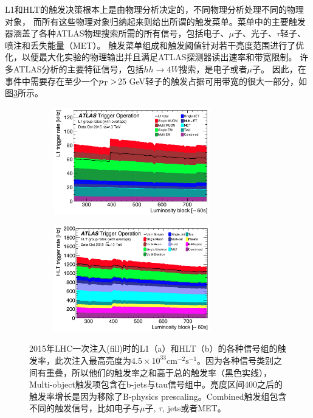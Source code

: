 L1和HLT的触发决策根本上是由物理分析决定的，不同物理分析处理不同的物理对象，
而所有这些物理对象归纳起来则给出所谓的触发菜单。菜单中的主要触发器涵盖了各种ATLAS物理搜索所需的所有信号，包括电子、$\mu$子、光子、$\tau$轻子、喷注和丢失能量（MET）。
触发菜单组成和触发阈值针对若干亮度范围进行了优化，以便最大化实验的物理输出并且满足ATLAS探测器读出速率和带宽限制。
许多ATLAS分析的主要特征信号，包括$hh\rightarrow 4W$搜索，是电子或者$\mu$子。 因此，在事件中需要存在至少一个$p_{\text{T}}>$25 GeV轻子的触发占据可用带宽的很大一部分，如图\ref{fig:Trigger_singlelepton}所示。
\begin{figure}[h]
\begin{center}
\begin{subfigure}[b]{\textwidth}
\centering
   \includegraphics[width=0.75\textwidth]{fig/content_menu_figures_Time_L1GroupRate_Stack.png}
   \caption{}
  \label{fig:L1_menu_rates}
  \end{subfigure}
 \begin{subfigure}[b]{\textwidth}
 \centering
  \includegraphics[width=0.75\textwidth]{fig/content_menu_figures_Time_HLTGroupRate_Stack.png}
   \caption{}
   \label{fig:HLT_menu_rates}
  \end{subfigure}
\caption{2015年LHC一次注入(fill)时的L1（a）和HLT（b）的各种信号组的触发率，此次注入最高亮度为$4.5\times10^{33}\text{cm}^{-2}\text{s}^{-1}$。因为各种信号类别之间有重叠，所以他们的触发率之和高于总的触发率（黑色实线），Multi-object触发项包含在b-jets与tau信号组中。亮度区间400之后的触发率增长是因为移除了B-physics prescaling。Combined触发组包含不同的触发信号，比如电子与$\mu$子, $\tau$, jets或者MET。\cite{Aaboud2017}} \label{fig:Trigger_singlelepton}
\end{center}
\end{figure}
